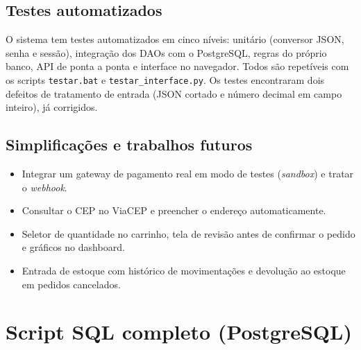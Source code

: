\documentclass[12pt]{article}
\begin{document}
\subsection{Testes automatizados}

O sistema tem testes automatizados em cinco níveis: unitário (conversor JSON, senha e sessão), integração dos DAOs com o PostgreSQL, regras do próprio banco, API de ponta a ponta e interface no navegador. Todos são repetíveis com os scripts \texttt{testar.bat} e \texttt{testar\_interface.py}. Os testes encontraram dois defeitos de tratamento de entrada (JSON cortado e número decimal em campo inteiro), já corrigidos.

\subsection{Simplificações e trabalhos futuros}

\begin{itemize}
\item Integrar um gateway de pagamento real em modo de testes (\textit{sandbox}) e tratar o \textit{webhook}.
\item Consultar o CEP no ViaCEP e preencher o endereço automaticamente.
\item Seletor de quantidade no carrinho, tela de revisão antes de confirmar o pedido e gráficos no dashboard.
\item Entrada de estoque com histórico de movimentações e devolução ao estoque em pedidos cancelados.
\end{itemize}


\newpage
\appendix
\section{Script SQL completo (PostgreSQL)}

\begingroup
{}
\endgroup
\end{document}

